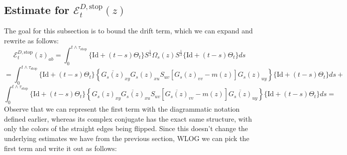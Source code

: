 \documentclass[11pt]{article}
\newcommand{\sto}{\text{stop}}
\begin{document}
\subsection{Estimate for $\mathcal{E}_t^{D, \text{stop}}(z)$} 
The goal for this subsection is to bound the drift term, which we can expand and rewrite as follows: 
$$\mathcal{E}_t^{D, \sto}(z)_{ab}=\int_0^{t\wedge \tau_\sto}\{\text{Id}+(t-s)\Theta_t\}S^{\frac{1}{2}}\Omega_s(z)S^{\frac{1}{2}}\{\text{Id}+(t-s)\Theta_t\}ds$$
$$=\int_0^{t\wedge \tau_\sto} \{\text{Id}+(t-s)\Theta_t\}\left\{
\overline{G_s(z)}_{xy} G_s(z)_{xu} S_{uv} 
\left[ G_s(z)_{vv} - m(z) \right] G_s(z)_{uy}
\right\}\{\text{Id}+(t-s)\Theta_t\}ds+
$$
$$
\int_0^{t\wedge \tau_\sto} \{\text{Id}+(t-s)\Theta_t\}\left\{
 G_s(z)_{xy} \overline{G_s(z)}_{xu} S_{uv} 
\left[ \overline{G_s(z)}_{vv} - m(z) \right] \overline{G_s(z)}_{uy} 
\right\} \{\text{Id}+(t-s)\Theta_t\}ds = 
$$
Observe that we can represent the first term with the diagrammatic notation defined earlier, whereas its complex conjugate has the exact same structure, with only the colors of the straight edges being flipped. Since this doesn't change the underlying estimates we have from the previous section, WLOG we can pick the first term and write it out as follows:
\end{document}

